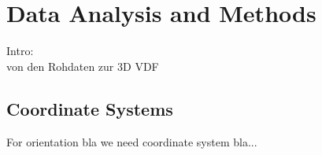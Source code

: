 
\chapter{Data Analysis and Methods} %

\label{Chapter:Data} 



Intro:\\
von den Rohdaten zur 3D VDF






\section{Coordinate Systems}
For orientation bla we need coordinate system bla...

%
